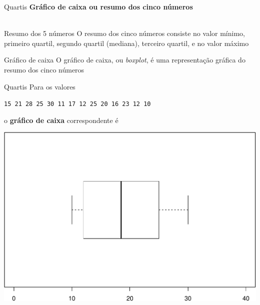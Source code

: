 \documentclass[10pt]{beamer}\usepackage[]{graphicx}\usepackage[]{color}
\newenvironment{knitrout}{}{} %
\theoremstyle{definition}
\begin{document}
\begin{frame}{Quartis}
  \textbf{Gráfico de caixa ou resumo dos cinco números}\\~\\
  \begin{block}{Resumo dos 5 números}
    O resumo dos cinco números consiste no valor mínimo, primeiro
    quartil, segundo quartil (mediana), terceiro quartil, e no valor
    máximo
  \end{block}
  \begin{block}{Gráfico de caixa}
    O gráfico de caixa, ou \textsl{boxplot}, é uma representação gráfica
    do resumo dos cinco números
  \end{block}
\end{frame}

\begin{frame}{Quartis}
  Para os valores
  \begin{center}
    \texttt{15 21 28 25 30 11 17 12 25 20 16 23 12 10}
  \end{center}
  o \textbf{gráfico de caixa} correspondente é
\begin{knitrout}\footnotesize
{}\color{fgcolor}

{\centering \includegraphics[width=.8\textwidth]{figure/unnamed-chunk-9-1} 

}



\end{knitrout}
\end{frame}
\end{document}
